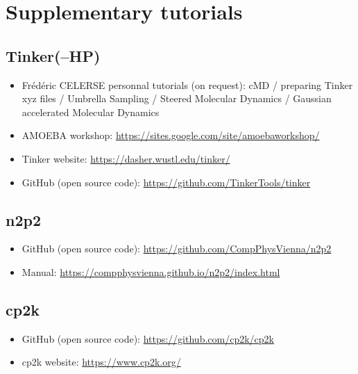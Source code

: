 \documentclass[12pt]{article}
\begin{document}
%
%
%
\newpage
{}
\section{Supplementary tutorials}
\label{sec:tutorials}
\subsection{Tinker(--HP)}
\begin{itemize}
    \item Frédéric CELERSE personnal tutorials (on request): cMD / preparing Tinker xyz files / Umbrella Sampling / Steered Molecular Dynamics / Gaussian accelerated Molecular Dynamics
    \item AMOEBA workshop: \url{https://sites.google.com/site/amoebaworkshop/}
    \item Tinker website: \url{https://dasher.wustl.edu/tinker/}
    \item GitHub (open source code): \url{https://github.com/TinkerTools/tinker}
\end{itemize}
\subsection{n2p2}
\begin{itemize}
    \item GitHub (open source code): \url{https://github.com/CompPhysVienna/n2p2}
    \item Manual: \url{https://compphysvienna.github.io/n2p2/index.html}
\end{itemize}
\subsection{cp2k}
\begin{itemize}
    \item GitHub (open source code): \url{https://github.com/cp2k/cp2k}
    \item cp2k website: \url{https://www.cp2k.org/}
\end{itemize}
\end{document}
